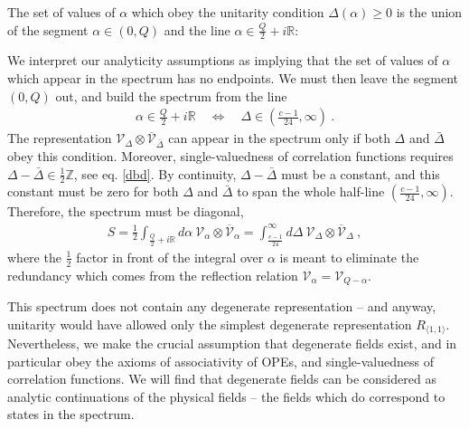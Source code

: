 \documentclass[12pt,a4paper,notitlepage]{report}
\numberwithin{equation}{section}
\theoremstyle{break}
\begin{document}
The set of values of $\alpha$ which obey the unitarity condition $\Delta(\alpha)\geq 0$ is the union of the segment $\alpha\in(0,Q)$ and the line $\alpha \in \frac{Q}{2}+i{\mathbb{R}}$:
\begin{center}
\end{center}
We interpret our analyticity assumptions as implying that the set of values of $\alpha$ which appear in the spectrum has no endpoints. 
We must then leave the segment $(0,Q)$ out, and build the spectrum from the line
\begin{align}
 \alpha \in \frac{Q}{2}+i{\mathbb{R}} \quad \Leftrightarrow \quad \Delta \in \left(\frac{c-1}{24},\infty\right)\ .
\label{aqd}
\end{align}
The representation $\mathcal{V}_\Delta\otimes \overline{\mathcal{V}}_{\bar{\Delta}}$ can appear in the spectrum only if both 
$\Delta$ and $\bar{\Delta}$ obey this condition. 
Moreover, single-valuedness of correlation functions requires $\Delta-\bar{\Delta}\in\frac12 {\mathbb{Z}} $, see eq. \eqref{dbd}.
By continuity, $\Delta-\bar{\Delta}$ must be a constant, and this constant must be zero for both $\Delta$ and $\bar{\Delta}$ to span the whole half-line $\left(\frac{c-1}{24},\infty\right)$.
Therefore, the spectrum must be diagonal,
\begin{align}
 \boxed{ S= \frac12\int_{\frac{Q}{2}+i{\mathbb{R}}} d\alpha\ \mathcal{V}_\alpha \otimes \overline{\mathcal{V}}_\alpha = \int_{\frac{c-1}{24}}^\infty d\Delta\ \mathcal{V}_\Delta\otimes \overline{\mathcal{V}}_\Delta} \ ,
\label{sad}
\end{align}
where the $\frac12$ factor in front of the integral over $\alpha$ is meant to eliminate the redundancy which comes from the reflection relation $\mathcal{V}_\alpha=\mathcal{V}_{Q-\alpha}$. 

This spectrum does not contain any degenerate representation -- and anyway, unitarity would have allowed only the simplest degenerate representation $R_{\langle 1,1\rangle}$. 
Nevertheless, we make the crucial assumption that degenerate fields exist, and in particular obey the axioms of associativity of OPEs, and single-valuedness of correlation functions.
We will find that degenerate fields can be considered as analytic continuations of the physical fields -- the fields which do correspond to states in the spectrum.
\end{document}

